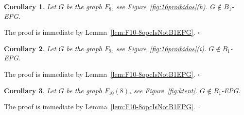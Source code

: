 \documentclass[9pt]{entcs}
\newtheorem{coro}{Corollary}[section]
\begin{document}


\begin{coro}\label{coro:f8}
Let $G$ be the graph $F_{8}$, see Figure~\ref{fig:16proibidos}(h). $G \notin B_1$-EPG. 
\end{coro}
\begin{pf}
The proof is immediate by Lemma~\ref{lem:F10-8opcIsNotB1EPG}. $\square$
\end{pf}

\begin{coro}\label{coro:f9}
Let $G$ be the graph $F_{9}$, see Figure~\ref{fig:16proibidos}(i). $G \notin B_1$-EPG. 
\end{coro}
\begin{pf}
The proof is immediate by Lemma~\ref{lem:F10-8opcIsNotB1EPG}. $\square$
\end{pf}



\begin{coro}\label{coro:F108IsNotB1EPG}
Let $G$ be the graph $F_{10}(8)$, see Figure~\ref{fig:ktent}. $G \notin B_1$-EPG. 
\end{coro}

\begin{pf}
The proof is immediate by Lemma~\ref{lem:F10-8opcIsNotB1EPG}. $\square$
\end{pf}


\end{document}
